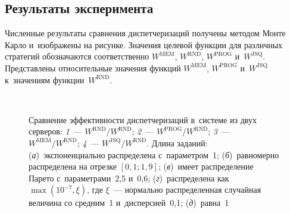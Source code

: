 \begin{multicols}{2}
\vspace*{-6pt}

\subsection{Результаты эксперимента}

    Численные результаты сравнения диспетчеризаций получены методом  
Мон\-те Кар\-ло и~изображены на рисунке. Значения целевой 
функции для различных стратегий обозначаются соответственно $W^{\mathrm{MEM}}$, 
$W^{\mathrm{RND}}$, $W^{\mathrm{PROG}}$ и~$W^{\mathrm{JSQ}}$. 
Представлены
относительные значения функций $W^{\mathrm{MEM}}$, $W^{\mathrm{PROG}}$ 
и~$W^{\mathrm{JSQ}}$  к~значениям функции~$W^{\mathrm{RND}}$.

\pagebreak

\end{multicols}

\begin{figure*} %
    \vspace*{1pt}
\begin{center}
\mbox{%
\epsfxsize=164.486mm
}
\end{center}
    \noindent
    {\small Сравнение эффективности диспетчеризаций в~системе из двух серверов:
    \textit{1}~--- $W^{\mathrm{RND}}/W^{\mathrm{RND}}$;
    \textit{2}~--- $W^{\mathrm{PROG}}/W^{\mathrm{RND}}$;
    \textit{3}~--- $W^{\mathrm{MEM}}/W^{\mathrm{RND}}$;
    \textit{4}~--- $W^{\mathrm{JSQ}}/W^{\mathrm{RND}}$. Длина заданий: 
(\textit{а})~экспоненциально распределена с~параметром~1; (\textit{б})~равномерно распределена на отрезке 
$[0{,}1;1{,}9]$; (\textit{в})~имеет распределение Парето с~параметрами~2,5 и~0,6; (\textit{г})~распределена 
как $\max(10^{-7}, \xi)$, где $\xi$~--- нормально распределенная случайная величина со средним~1 
и~дисперсией~0,1; (\textit{д})~равна~1}
    \end{figure*}

